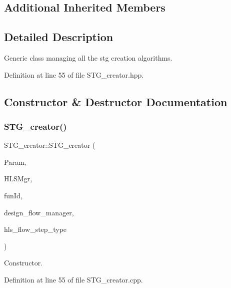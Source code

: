 \subsection*{Additional Inherited Members}


\subsection{Detailed Description}
Generic class managing all the stg creation algorithms. 

Definition at line 55 of file S\+T\+G\+\_\+creator.\+hpp.



\subsection{Constructor \& Destructor Documentation}
\mbox{\label{classSTG__creator_a7d9a3b78fc88a228a77b70a7bc5a576d}} 
\subsubsection{\texorpdfstring{S\+T\+G\+\_\+creator()}{STG\_creator()}}
{\footnotesize\ttfamily S\+T\+G\+\_\+creator\+::\+S\+T\+G\+\_\+creator (\begin{DoxyParamCaption}\item[{const \hyperlink{Parameter_8hpp_a37841774a6fcb479b597fdf8955eb4ea}{Parameter\+Const\+Ref}}]{Param,  }\item[{const \hyperlink{hls__manager_8hpp_acd3842b8589fe52c08fc0b2fcc813bfe}{H\+L\+S\+\_\+manager\+Ref}}]{H\+L\+S\+Mgr,  }\item[{unsigned int}]{fun\+Id,  }\item[{const Design\+Flow\+Manager\+Const\+Ref}]{design\+\_\+flow\+\_\+manager,  }\item[{const \hyperlink{hls__step_8hpp_ada16bc22905016180e26fc7e39537f8d}{H\+L\+S\+Flow\+Step\+\_\+\+Type}}]{hls\+\_\+flow\+\_\+step\+\_\+type }\end{DoxyParamCaption})}



Constructor. 



Definition at line 55 of file S\+T\+G\+\_\+creator.\+cpp.



